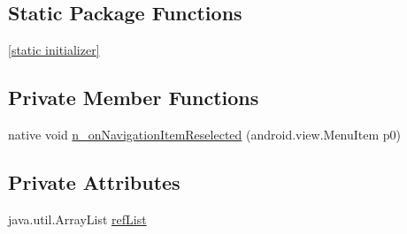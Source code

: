 \subsection*{Static Package Functions}
\begin{CompactItemize}
\item 
\hyperlink{classmono_1_1android_1_1support_1_1design_1_1widget_1_1_bottom_navigation_view___on_navigation_ibc61d53e910ce9033a3261f22503637c_ba10ad03fcfd5202fb68394ce5b6b61d}{\mbox{[}static initializer\mbox{]}}
\end{CompactItemize}
\subsection*{Private Member Functions}
\begin{CompactItemize}
\item 
native void \hyperlink{classmono_1_1android_1_1support_1_1design_1_1widget_1_1_bottom_navigation_view___on_navigation_ibc61d53e910ce9033a3261f22503637c_994fd4f8af23fdc1874f1f92b9660865}{n\_\-onNavigationItemReselected} (android.view.MenuItem p0)
\end{CompactItemize}
\subsection*{Private Attributes}
\begin{CompactItemize}
\item 
java.util.ArrayList \hyperlink{classmono_1_1android_1_1support_1_1design_1_1widget_1_1_bottom_navigation_view___on_navigation_ibc61d53e910ce9033a3261f22503637c_2cb893a0361285d48291f61372a4f4a1}{refList}
\end{CompactItemize}


